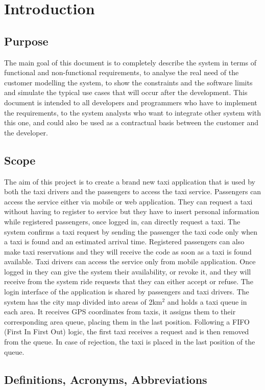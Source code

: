 \section{Introduction}
\subsection{Purpose}
The main goal of this document is to completely describe the system in terms of functional and non-functional requirements, to analyse the real need of the customer modelling the system, to show the constraints and the software limits and simulate the typical use cases that will occur after the development. This document is intended to all developers and programmers who have to implement the requirements, to the system analysts who want to integrate other system with this one, and could also be used as a contractual basis between the customer and the developer.
\subsection{Scope}
The aim of this project is to create a brand new taxi application that is used by both the taxi drivers and the passengers to access the taxi service. Passengers can access the service either via mobile or web application. They can request a taxi without having to register to service but they have to insert personal information while registered passengers, once logged in, can directly request a taxi. The system confirms a taxi request by sending the passenger the taxi code only when a taxi is found and an estimated arrival time. Registered passengers can also make taxi reservations and they will receive the code as soon as a taxi is found available. Taxi drivers can access the service only from mobile application. Once logged in they can give the system their availability, or revoke it, and they will receive from the system ride requests that they can either accept or refuse. The login interface of the application is shared by passengers and taxi drivers.
The system has the city map divided into areas of 2km$^{2}$ and holds a taxi queue in each area. It receives GPS coordinates from taxis, it assigns them to their corresponding area queue, placing them in the last position. Following a FIFO (First In First Out) logic, the first taxi receives a request and is then removed from the queue. In case of rejection, the taxi is placed in the last position of the queue.
\subsection{Definitions, Acronyms, Abbreviations}
